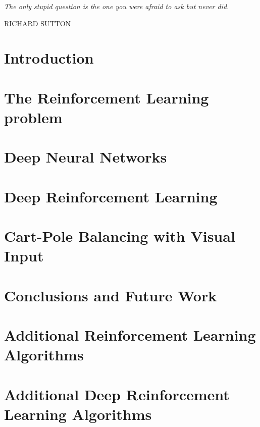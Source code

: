 \documentclass[a4paper, 12pt]{report}
\begin{document}
\clearpage
\thispagestyle{empty}
\null\vfill

\newlength\longest

\settowidth{}

\begin{center}
	\parbox{\longest}{%
	\raggedright{\Large\itshape%
		The only stupid question is the one you were afraid to
		ask but never did.
\par\bigskip
	}   
	\raggedleft\large\MakeUppercase{Richard Sutton}\par%
}

\end{center}
\vfill\vfill

\clearpage

\tableofcontents




\chapter{Introduction}


\chapter{The Reinforcement Learning problem}


\chapter{Deep Neural Networks}


\chapter{Deep Reinforcement Learning}



\chapter{Cart-Pole Balancing with Visual Input}


\chapter{Conclusions and Future Work}


\appendix

\chapter{Additional Reinforcement Learning Algorithms}


\chapter{Additional Deep Reinforcement Learning Algorithms}



\newpage



\nocite{*}

\end{document}
